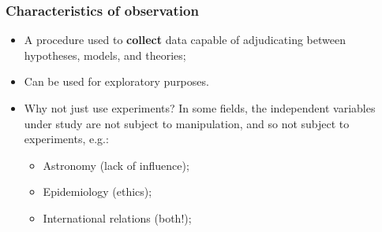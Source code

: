 \documentclass[aspectratio=169]{beamer}
\theoremstyle{principle}
\begin{document}
%
%

\begin{frame}
\frametitle{Characteristics of observation}

\begin{itemize}
\item A procedure used to \textbf{collect} data capable of adjudicating between hypotheses, models, and theories;
\bigskip
\bigskip

\item Can be used for exploratory purposes.
\bigskip
\bigskip

\item Why not just use experiments?  \color{white}In some fields, the independent variables under study are not subject to manipulation, and so not subject to experiments, e.g.:
\begin{itemize}
\item[]\color{white} Astronomy (lack of influence);
\item[]\color{white} Epidemiology (ethics);
\item[]\color{white} International relations (both!);
\end{itemize}

\end{itemize}

\end{frame}
\end{document}
